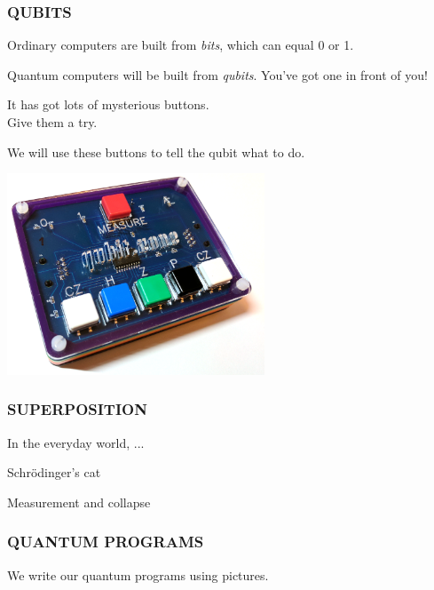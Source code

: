\documentclass[aspectratio=169]{beamer}
\begin{document}
\newcommand\col[2]{\begin{minipage}{#1\textwidth}\raggedright #2\end{minipage}}

\begin{frame}
\frametitle{QUBITS}

\col{0.5}{
Ordinary computers are built from \textit{bits}, which can equal 0 or 1.

\vspace{10pt}
Quantum computers will be built from \textit{qubits}. You've got one in front of you!

\vspace{10pt}
It has got lots of mysterious buttons.
\\
Give them a try.

\vspace{10pt}
We will use these buttons to tell the qubit what to do.
}
\col{0.4}{\includegraphics[height=6cm]{images/qubit_1.png}}

\end{frame}

\begin{frame}
\frametitle{SUPERPOSITION}

In the everyday world, ...

\vspace{20pt}
Schr\"odinger's cat

Measurement and collapse

\end{frame}

\begin{frame}
\frametitle{QUANTUM PROGRAMS}

We write our quantum programs using pictures.

\end{frame}
\end{document}
